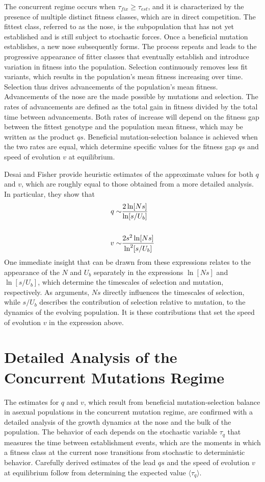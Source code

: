 \documentclass[12pt, one column]{article}
\begin{document}
The concurrent regime occurs when $\tau_{fix} \ge \tau_{est}$, and it is characterized by the presence of multiple distinct fitness classes, which are in direct competition.  The fittest class, referred to as the nose, is the subpopulation that has not yet established and is still subject to stochastic forces.  Once a beneficial mutation establishes, a new nose subsequently forms.  The process repeats and leads to the progressive appearance of fitter classes that eventually establish and introduce variation in fitness into the population.  Selection continuously removes less fit variants, which results in the population's mean fitness increasing over time.  Selection thus drives advancements of the population's mean fitness.  Advancements of the nose are the made possible by mutations and selection.  The rates of advancements are defined as the total gain in fitness divided by the total time between advancements.  Both rates of increase will depend on the fitness gap between the fittest genotype and the population mean fitness, which may be written as the product $qs$.  Beneficial mutation-selection balance is achieved when the two rates are equal, which determine specific values for the fitness gap $qs$ and speed of evolution $v$ at equilibrium. 

Desai and Fisher provide heuristic estimates of the approximate values for both $q$ and $v$, which are roughly equal to those obtained from a more detailed analysis.  In particular, they show that
\begin{equation}
\begin{aligned}
q \sim & {2\ln[Ns] \over \ln[s/U_b]} \\   
\\
v \sim & {2s^2\ln[Ns] \over \ln^2[s/U_b]}
\end{aligned}
\end{equation}
One immediate insight that can be drawn from these expressions relates to the appearance of the $N$ and $U_b$ separately in the expressions $\ln[Ns]$ and $\ln[s/U_b]$, which determine the timescales of selection and mutation, respectively.  As arguments, $Ns$ directly influences the timescales of selection, while $s/U_b$ describes the contribution of selection relative to mutation, to the dynamics of the evolving population.  It is these contributions that set the speed of evolution $v$ in the expression above.   

\section*{Detailed Analysis of the Concurrent Mutations Regime}
The estimates for $q$ and $v$, which result from beneficial mutation-selection balance in asexual populations in the concurrent mutation regime, are confirmed with a detailed analysis of the growth dynamics at the nose and the bulk of the population.  The behavior of each depends on the stochastic variable $\tau_q$ that measures the time between establishment events, which are the moments in which a fitness class at the current nose transitions from stochastic to deterministic behavior.  Carefully derived estimates of the lead $qs$ and the speed of evolution $v$ at equilibrium follow from determining the expected value $\langle \tau_q \rangle$.   
\end{document}

